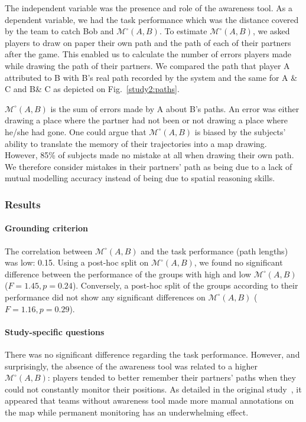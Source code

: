 \documentclass[natbib]{svjour3}
\newcommand{\A}{A\xspace}
\newcommand{\B}{B\xspace}
\newcommand{\C}{C\xspace}
\newcommand{\gModel}[2]{{$\mathcal{M}^{\circ}(#1, #2)$}}
\begin{document}
The independent variable was the presence and role of the awareness tool. As a
dependent variable, we had the task performance which was the distance covered
by the team to catch Bob and \gModel{A}{B}. To estimate \gModel{A}{B}, we asked
players to draw on paper their own path and the path of each of their partners
after the game. This enabled us to calculate the number of errors players made
while drawing the path of their partners. We compared the path that player \A
attributed to \B with \B's real path recorded by the system and the same for \A
\& \C and \B \& \C as depicted on Fig.~\ref{study2:paths}. 

\gModel{A}{B} is the sum of errors made by \A about \B's paths. An error was
either drawing a place where the partner had not been or not drawing a place
where he/she had gone. One could argue that \gModel{A}{B} is biased by the
subjects' ability to translate the memory of their trajectories into a map drawing.
However, 85\% of subjects made no mistake at all when drawing their own path.
We therefore consider mistakes in their partners' path as being due to a lack
of mutual modelling accuracy instead of being due to spatial reasoning skills.

\subsubsection*{Results}

\paragraph{Grounding criterion} The correlation between \gModel{A}{B} and the
task performance (path lengths) was low: 0.15. Using a post-hoc split on
\gModel{A}{B}, we found no significant difference between the performance of the
groups with high and low \gModel{A}{B}  ($F = 1.45, p = 0.24$). Conversely, a
post-hoc split of the groups according to their performance did not show
any significant differences on \gModel{A}{B} ($F = 1.16, p = 0.29$).

\paragraph{Study-specific questions} There was no significant difference
regarding the task performance. However, and surprisingly, the absence of the
awareness tool was related to a higher \gModel{A}{B}: players tended to better
remember their partners' paths when they could not constantly monitor their
positions. As detailed in the original study~\citep{nova2005location}, it
appeared that teams without awareness tool made more manual annotations on the
map while permanent monitoring has an underwhelming effect.
\end{document}
